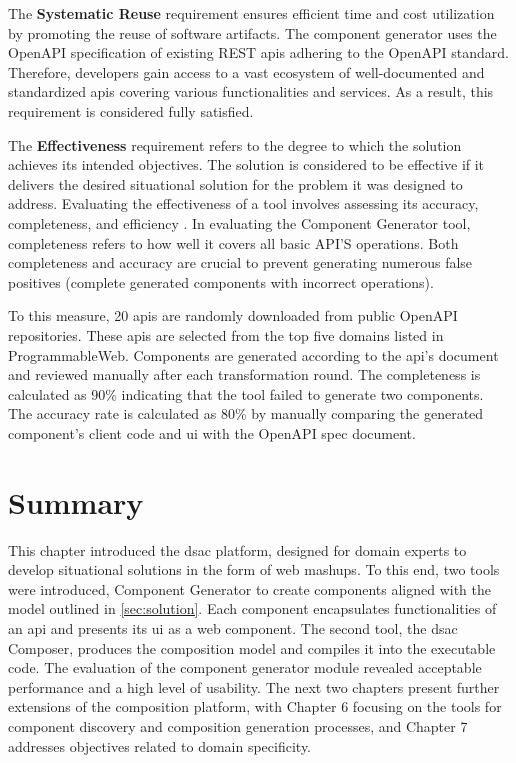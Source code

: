 The \textbf{Systematic Reuse} requirement ensures efficient time and cost utilization by promoting the reuse of software artifacts. The component generator uses the OpenAPI specification of existing REST \gls{api}s adhering to the OpenAPI standard. Therefore, developers gain access to a vast ecosystem of well-documented and standardized \gls{api}s covering various functionalities and services. As a result, this requirement is considered fully satisfied. 

The \textbf{Effectiveness} requirement refers to the degree to which the solution achieves its intended objectives. The solution is considered to be effective if it delivers the desired situational solution for the problem it was designed to address. Evaluating the effectiveness of a tool involves assessing its accuracy, completeness, and efficiency \autocite{Semiawan2021}. In evaluating the Component Generator tool, completeness refers to how well it covers all basic API’S operations. Both completeness and accuracy are crucial to prevent generating numerous false positives (complete generated components with incorrect operations).

To this measure, 20 \gls{api}s are randomly downloaded from public OpenAPI repositories. These \gls{api}s are selected from the top five domains listed in ProgrammableWeb. Components are generated according to the \gls{api}’s document and reviewed manually after each transformation round. The completeness is calculated as 90\% indicating that the tool failed to generate two components. The accuracy rate is calculated as 80\% by manually comparing the generated component’s client code and \gls{ui} with the OpenAPI spec document. 

\vspace{-15pt}
\hypertarget{sec:cp.summary}{%
\section{Summary}\label{sec:cp.summary}}
\vspace{10pt}

This chapter introduced the \gls{dsac} platform, designed for domain experts to develop situational solutions in the form of web mashups. To this end, two tools were introduced, Component Generator to create components aligned with the model outlined in \cref{sec:solution}. Each component encapsulates functionalities of an  \gls{api} and presents its \gls{ui} as a web component. The second tool, the \gls{dsac} Composer, produces the composition model and compiles it into the executable code. The evaluation of the component generator module revealed acceptable performance and a high level of usability. The next two chapters present further extensions of the composition platform, with Chapter 6 focusing on the tools for component discovery and composition generation processes, and Chapter 7 addresses objectives related to domain specificity.